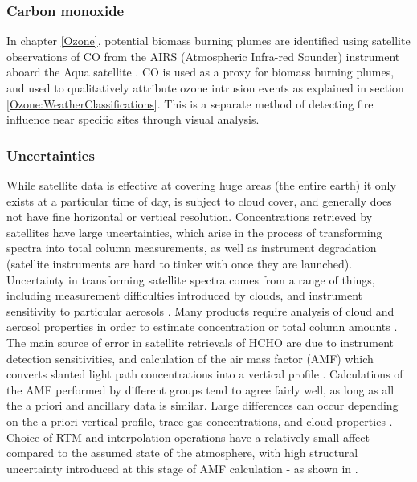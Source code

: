     \subsubsection{Carbon monoxide}
      \label{Model:Datasets:AIRS}
      
      In chapter \ref{Ozone}, potential biomass burning plumes are identified using satellite observations of CO from the AIRS (Atmospheric Infra-red Sounder) instrument aboard the Aqua satellite \parencite{AIRS3STD}.
      CO is used as a proxy for biomass burning plumes, and used to qualitatively attribute ozone intrusion events as explained in section \ref{Ozone:WeatherClassifications}.
      This is a separate method of detecting fire influence near specific sites through visual analysis.
      
  
    \subsubsection{Uncertainties}
      
      While satellite data is effective at covering huge areas (the entire earth) it only exists at a particular time of day, is subject to cloud cover, and generally does not have fine horizontal or vertical resolution.
      Concentrations retrieved by satellites have large uncertainties, which arise in the process of transforming spectra into total column measurements, as well as instrument degradation (satellite instruments are hard to tinker with once they are launched).
      Uncertainty in transforming satellite spectra comes from a range of things, including measurement difficulties introduced by clouds, and instrument sensitivity to particular aerosols \parencite{Millet2006}.
      Many products require analysis of cloud and aerosol properties in order to estimate concentration or total column amounts \parencite{Palmer2001,Palmer2003, Marais2012, Vasilkov2017}.
      The main source of error in satellite retrievals of HCHO are due to instrument detection sensitivities, and calculation of the air mass factor (AMF) which converts slanted light path concentrations into a vertical profile \parencite{Millet2006}.
      Calculations of the AMF performed by different groups tend to agree fairly well, as long as all the a priori and ancillary data is similar.
      Large differences can occur depending on the a priori vertical profile, trace gas concentrations, and cloud properties \parencite{Lorente2017}.
      Choice of RTM and interpolation operations have a relatively small affect compared to the assumed state of the atmosphere, with high structural uncertainty introduced at this stage of AMF calculation - as shown in \textcite{Lorente2017}.
      
